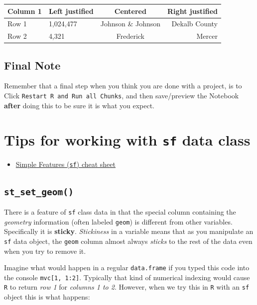 \documentclass[
]{book}
\providecommand{\tightlist}{%
  \setlength{\itemsep}{0pt}\setlength{\parskip}{0pt}}
\begin{document}
\begin{longtable}[]{@{}llcr@{}}
\toprule()
Column 1 & Left justified & Centered & Right justified \\
\midrule()
\endhead
Row 1 & 1,024,477 & Johnson \& Johnson & Dekalb County \\
Row 2 & 4,321 & Frederick & Mercer \\
\bottomrule()
\end{longtable}

\hypertarget{final-note}{%
\section{Final Note}\label{final-note}}

Remember that a final step when you think you are done with a project, is to Click \texttt{Restart\ R\ and\ Run\ all\ Chunks}, and then save/preview the Notebook \textbf{after} doing this to be sure it is what you expect.

\hypertarget{sf-overview}{%
\chapter{\texorpdfstring{Tips for working with \texttt{sf} data class}{Tips for working with sf data class}}\label{sf-overview}}

\begin{itemize}
\tightlist
\item
  \href{https://github.com/rstudio/cheatsheets/raw/master/sf.pdf}{Simple Features (\texttt{sf}) cheat sheet}
\end{itemize}

\hypertarget{st_set_geom}{%
\section{\texorpdfstring{\texttt{st\_set\_geom()}}{st\_set\_geom()}}\label{st_set_geom}}

There is a feature of \texttt{sf} class data in that the special column containing the \emph{geometry} information (often labeled \texttt{geom}) is different from other variables. Specifically it is \textbf{sticky}. \emph{Stickiness} in a variable means that as you manipulate an \texttt{sf} data object, the \texttt{geom} column almost always \emph{sticks} to the rest of the data even when you try to remove it.

Imagine what would happen in a regular \texttt{data.frame} if you typed this code into the console \texttt{mvc{[}1,\ 1:2{]}}. Typically that kind of numerical indexing would cause \texttt{R} to return \emph{row 1} for \emph{columns 1 to 2}. However, when we try this in \texttt{R} with an \texttt{sf} object this is what happens:
\end{document}
